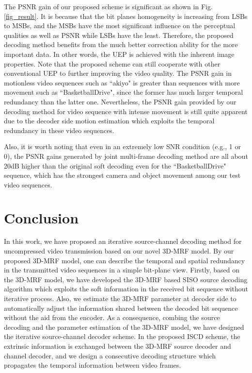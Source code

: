 \documentclass[10pt,twocolumn,twoside]{IEEEtran}
\begin{document}
The PSNR gain of our proposed scheme is significant as shown in Fig. \ref{fig_result}. It is because that the bit planes homogeneity is increasing from LSBs to MSBs, and the MSBs have the most significant influence on the perceptual qualities as well as PSNR while LSBs have the least. Therefore, the proposed decoding method benefits from the much better correction ability for the more important data. In other words, the UEP is achieved with the inherent image properties. Note that the proposed scheme can still cooperate with other conventional UEP to further improving the video quality. The PSNR gain in motionless video sequences such as ``akiyo" is greater than sequences with more movement such as ``BasketballDrive", since the former has much larger temporal redundancy than the latter one. Nevertheless, the PSNR gain provided by our decoding method for video sequence with intense movement is still quite apparent due to the decoder side motion estimation which exploits the temporal redundancy in these video sequences.

Also, it is worth noting that even in an extremely low SNR condition (e.g., 1 or 0), the PSNR gains generated by joint multi-frame decoding method
are all about 20dB higher than the original soft decoding even for the ``BasketballDrive" sequence, which has the strongest camera and object movement among our test video sequences. 

\section{Conclusion}\label{sec_con}
In this work, we have proposed an iterative source-channel decoding method for uncompressed video transmission based on our novel 3D-MRF model. By our proposed 3D-MRF model, one can describe the temporal and spatial redundancy in the transmitted video sequences in a simple bit-plane view. Firstly, based on the 3D-MRF model, we have developed the 3D-MRF based SISO source decoding algorithm which exploits the soft information in the received bit sequence without iterative process. Also, we estimate the 3D-MRF parameter at decoder side to automatically adjust the information shared between the decoded bit sequence without the aid from the encoder.  As a consequence, combing the source decoding and the parameter estimation of the 3D-MRF model, we have designed the iterative source-channel decoder scheme. In the proposed ISCD scheme, the extrinsic information is exchanged between the 3D-MRF source decoder and channel decoder, and we design a consecutive decoding structure which propagates the temporal information between video frames.
\end{document}
